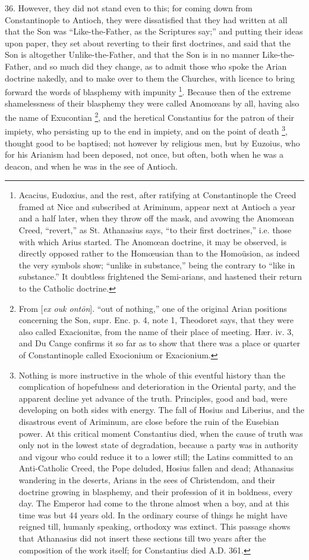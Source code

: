 36. However, they did not
stand even to this; for coming down from Constantinople to Antioch,
they were dissatisfied that they had written at all that the Son was ``Like-the-Father,
as the Scriptures say;'' and putting their ideas upon paper, they set
about reverting to their first doctrines, and said that the Son is
altogether Unlike-the-Father, and that the Son is in no manner
Like-the-Father, and so much did they change, as to admit those who
spoke the Arian doctrine nakedly, and to make over to them the
Churches, with licence to bring forward the words of blasphemy with
impunity \footnote{Acacius, Eudoxius, and the rest, after ratifying at Constantinople the
Creed framed at Nice and subscribed at Ariminum, appear next at
Antioch a year and a half later, when they throw off the mask, and
avowing the Anomœan Creed, ``revert,'' as St. Athanasius says, ``to
their first doctrines,'' i.e. those with which Arius started. The Anomœan
doctrine, it may be observed, is directly opposed rather to the Homœusian
than to the Homoüsion, as indeed the very symbols show; ``unlike in
substance,'' being the contrary to ``like in substance.'' It doubtless
frightened the Semi-arians, and hastened their return to the Catholic
doctrine.}. Because then
of the extreme shamelessness of their blasphemy they were called Anomœans
by all, having also the name of Exucontian \footnote{From [\emph{ex ouk ont\={o}n}]. ``out of nothing,'' one of the
original Arian positions concerning the Son, supr. Enc. p. 4, note 1,
Theodoret says, that they were also called Exacionitæ, from the name
of their place of meeting. Hær. iv. 3, and Du Cange confirms it so
far as to show that there was a place or quarter of Constantinople
called Exocionium or Exacionium.}, and the heretical Constantius for the patron of their
impiety, who persisting up to the end in impiety, and on the point of
death \footnote{Nothing is more instructive in the whole of this eventful history than
the complication of hopefulness and deterioration in the Oriental
party, and the apparent decline yet advance of the truth. Principles,
good and bad, were developing on both sides with energy. The fall of
Hosius and Liberius, and the disastrous event of Ariminum, are close
before the ruin of the Eusebian power. At this critical moment
Constantius died, when the cause of truth was only not in the lowest
state of degradation, because a party was in authority and vigour who
could reduce it to a lower still; the Latins committed to an
Anti-Catholic Creed, the Pope deluded, Hosius fallen and dead;
Athanasius wandering in the deserts, Arians in the sees of
Christendom, and their doctrine growing in blasphemy, and their
profession of it in boldness, every day. The Emperor had come to the
throne almost when a boy, and at this time was but 44 years old. In
the ordinary course of things he might have reigned till, humanly
speaking, orthodoxy was extinct. This passage shows that Athanasius
did not insert these sections till two years after the composition of
the work itself; for Constantius died A.D.
361.}, thought good to
be baptised; not however by religious men, but by Euzoius, who
for his Arianism had been deposed, not once, but often, both when he
was a deacon, and when he was in the see of Antioch.

